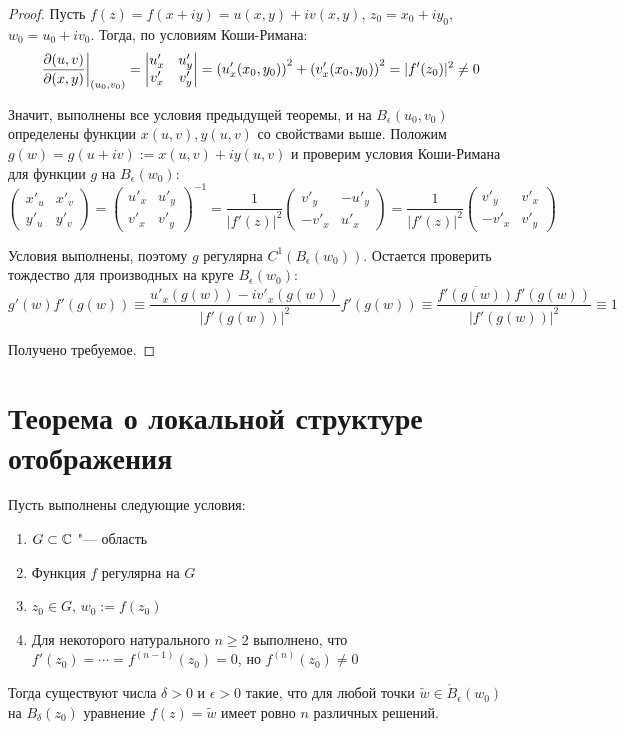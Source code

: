 \begin{proof}
	Пусть $f(z) = f(x + iy) = u(x, y) + iv(x, y)$, $z_0 = x_0 + iy_0$, $w_0 = u_0 + iv_0$. Тогда, по условиям Коши-Римана:
	\[\left.\frac{\partial (u, v)}{\partial (x, y)}\right|_{(u_0, v_0)} = \begin{vmatrix}
		u'_x & u'_y \\ v'_x & v'_y
	\end{vmatrix} = \left(u'_x(x_0, y_0)\right)^2 + \left(v'_x(x_0, y_0)\right)^2 = |f'(z_0)|^2 \ne 0\]

	Значит, выполнены все условия предыдущей теоремы, и на $B_\epsilon(u_0, v_0)$ определены функции $x(u, v), y(u, v)$ со свойствами выше. Положим $g(w) = g(u + iv) := x(u, v) + iy(u, v)$ и проверим условия Коши-Римана для функции $g$ на $B_\epsilon(w_0)$:
	\[\begin{pmatrix}
		x'_u & x'_v \\
		y'_u & y'_v
	\end{pmatrix}
	= \begin{pmatrix}
		u'_x & u'_y \\
		v'_x & v'_y
	\end{pmatrix}^{-1}
	=
	\frac1{|f'(z)|^2}\begin{pmatrix}
		v'_y & -u'_y \\
		-v'_x & u'_x
	\end{pmatrix} = \frac1{|f'(z)|^2}\begin{pmatrix}
	v'_y & v'_x \\
	-v'_x & v'_y
	\end{pmatrix}\]
	
	Условия выполнены, поэтому $g$ регулярна $C^1(B_\epsilon(w_0))$. Остается проверить тождество для производных на круге $B_\epsilon(w_0)$:
	\vspace*{-6pt}
	\[g'(w)f'(g(w)) \equiv \frac{u'_x(g(w)) - iv'_x(g(w))}{|f'(g(w))|^2}f'(g(w)) \equiv \frac{\overline{f'(g(w))}f'(g(w))}{|f'(g(w))|^2} \equiv 1\]
	
	Получено требуемое.
\end{proof}

\section{Теорема о локальной структуре отображения}

\begin{theorem}
	Пусть выполнены следующие условия:
	\begin{enumerate}
		\item $G \subset \mathbb{C}$ "--- область
		\item Функция $f$ регулярна на $G$
		\item $z_0 \in G$, $w_0 := f(z_0)$
		\item Для некоторого натурального $n \ge 2$ выполнено, что $f'(z_0) = \dotsb = f^{(n - 1)}(z_0) = 0$, но $f^{(n)}(z_0) \ne 0$
	\end{enumerate}
	
	Тогда существуют числа $\delta > 0$ и $\epsilon > 0$ такие, что для любой точки $\widetilde w \in \mathring B_\epsilon(w_0)$ на $B_\delta(z_0)$ уравнение $f(z) = \widetilde w$ имеет ровно $n$ различных решений.
\end{theorem}

